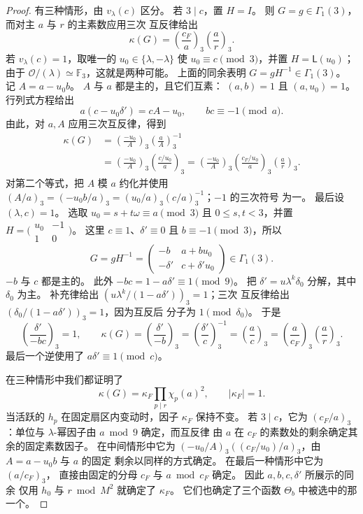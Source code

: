 \documentclass[11pt,a4paper]{article}
\numberwithin{equation}{section}
\numberwithin{figure}{section}
\theoremstyle{definition}
\theoremstyle{remark}
\begin{document}
\begin{proof}
有三种情形，由 $v_\lambda(c)$ 区分。
若 $3\mid c$，置 $H=I$。 则 $G=g\in\Gamma_1(3)$，而对主 $a$
与 $r$ 的主素数应用三次
互反律给出
\begin{equation}\label{eq:reflection-cusp-case-zero}
 \kappa(G)=\left(\frac{c_F}{a}\right)_3
             \left(\frac ar\right)_3.
\end{equation}
若 $v_\lambda(c)=1$，取唯一的 $u_0\in\{\lambda,-\lambda\}$
使 $u_0\equiv c\pmod3$，并置 $H=\mathsf L(u_0)$；由于
$\mathcal O/(\lambda)\simeq\mathbb F_3$，这就是两种可能。
上面的同余表明 $G=gH^{-1}\in\Gamma_1(3)$。
记 $A=a-u_0b$。 $A$ 与 $a$ 都是主的，且它们互素：
$(a,b)=1$ 且 $(a,u_0)=1$。 行列式方程给出
\[
 a(c-u_0\delta')=cA-u_0,
 \qquad bc\equiv-1\pmod a.
\]
由此，对 $a,A$ 应用三次互反律，得到
\[
 \begin{split}
 \kappa(G)
 &=\left(\frac{-u_0}{A}\right)_3
          \left(\frac aA\right)_3^{-1}\\
 &=\left(\frac{-u_0}{A}\right)_3
          \left(\frac{c/u_0}{a}\right)_3
  =\left(\frac{-u_0}{A}\right)_3
          \left(\frac{c_F/u_0}{a}\right)_3
          \left(\frac ar\right)_3.
 \end{split}
\]
对第二个等式，把 $A$ 模 $a$ 约化并使用
$(A/a)_3=(-u_0b/a)_3=(u_0/a)_3(c/a)_3^{-1}$；$-1$ 的三次符号
为一。 最后设 $(\lambda,c)=1$。 选取
$u_0=s+t\omega\equiv a\pmod3$ 且 $0\le s,t<3$，并置
$H=\bigl(\begin{smallmatrix}u_0&-1\\1&0\end{smallmatrix}\bigr)$。
这里 $c\equiv1$、$\delta'\equiv0$ 且 $b\equiv-1\pmod3$，所以
\[
 G=gH^{-1}=\begin{pmatrix}-b&a+bu_0\\-\delta'&c+\delta'u_0\end{pmatrix}
       \in\Gamma_1(3).
\]
$-b$ 与 $c$ 都是主的。 此外 $-bc=1-a\delta'\equiv1\pmod9$。
把 $\delta'=u\lambda^k\delta_0$ 分解，其中 $\delta_0$ 为主。
补充律给出 $(u\lambda^k/(1-a\delta'))_3=1$；三次
互反律给出 $(\delta_0/(1-a\delta'))_3=1$，因为互反后
分子为 $1\pmod{\delta_0}$。 于是
\[
 \left(\frac{\delta'}{-bc}\right)_3=1,
 \qquad
 \kappa(G)=\left(\frac{\delta'}{-b}\right)_3
          =\left(\frac{\delta'}c\right)_3^{-1}
          =\left(\frac ac\right)_3
          =\left(\frac a{c_F}\right)_3\left(\frac ar\right)_3.
\]
最后一个逆使用了 $a\delta'\equiv1\pmod c$。

在三种情形中我们都证明了
\begin{equation}\label{eq:reflection-multiplier}
 \kappa(G)=\kappa_F\prod_{p\mid r}\chi_p(a)^2,
 \qquad |\kappa_F|=1.
\end{equation}
当活跃的 $h_p$ 在固定扇区内变动时，因子 $\kappa_F$ 保持不变。
若 $3\mid c$，它为 $(c_F/a)_3$：单位与
$\lambda$-幂因子由 $a\bmod9$ 确定，而互反律
由 $a$ 在 $c_F$ 的素数处的剩余确定其余的固定素数因子。 在中间情形中它为
$(-u_0/A)_3((c_F/u_0)/a)_3$，由 $A=a-u_0b$ 与 $a$ 的固定
剩余以同样的方式确定。 在最后一种情形中它为 $(a/c_F)_3$，
直接由固定的分母 $c_F$ 与
$a\bmod c_F$ 确定。 因此 $a,b,c,\delta'$ 所展示的同余
仅用 $h_0$ 与 $r\bmod M^2$ 就确定了 $\kappa_F$。
它们也确定了三个函数 $\Theta_b$ 中被选中的那一个。


\end{proof}
\end{document}
